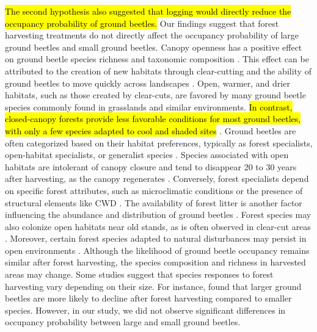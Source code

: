 \hl{The second hypothesis also suggested that logging would directly reduce the occupancy probability of ground beetles. }
Our findings suggest that forest harvesting treatments do not directly affect the occupancy probability of large ground beetles and small ground beetles. 
Canopy openness has a positive effect on ground beetle species richness and taxonomic composition \citep{Halme1993Carabidbeetles,Heliola2001Distributioncarabid,Koivula2002Alternativeharvesting}. 
This effect can be attributed to the creation of new habitats through clear-cutting and the ability of ground beetles to move quickly across landscapes \citep{Niemela2007effectsforestry}. 
Open, warmer, and drier habitats, such as those created by clear-cuts, are favored by many ground beetle species commonly found in grasslands and similar environments. 
\hl{In contrast, closed-canopy forests provide less favorable conditions for most ground beetles, with only a few species adapted to cool and shaded sites} \citep{Niemela1993Effectsclearcut,koivulaBorealCarabidbeetleColeoptera2002a}. 
Ground beetles are often categorized based on their habitat preferences, typically as forest specialists, open-habitat specialists, or generalist species \citep{Niemela2007effectsforestry}. 
Species associated with open habitats are intolerant of canopy closure and tend to disappear 20 to 30 years after harvesting, as the canopy regenerates \citep{Niemela1996importancesmallscale,Koivula2002Alternativeharvesting}. 
Conversely, forest specialists depend on specific forest attributes, such as microclimatic conditions or the presence of structural elements like CWD \citep{Niemela1996importancesmallscale,Heliola2001Distributioncarabid,Koivula2002Alternativeharvesting,Work2004Standcomposition}. 
The availability of forest litter is another factor influencing the abundance and distribution of ground beetles \citep{koivula.LeafLitterSmallscale1999,Heliola2001Distributioncarabid,Magura2005ImpactsLeaflitter}. 
Forest species may also colonize open habitats near old stands, as is often observed in clear-cut areas \citep{Spence1996Northernforestry,Koivula2002Alternativeharvesting}. 
Moreover, certain forest species adapted to natural disturbances may persist in open environments \citep{Niemela2007effectsforestry}. 
Although the likelihood of ground beetle occupancy remains similar after forest harvesting, the species composition and richness in harvested areas may change. 
Some studies suggest that species responses to forest harvesting vary depending on their size. 
For instance, \cite{Nolte2019Habitatspecialization} found that larger ground beetles are more likely to decline after forest harvesting compared to smaller species. 
However, in our study, we did not observe significant differences in occupancy probability between large and small ground beetles. 

